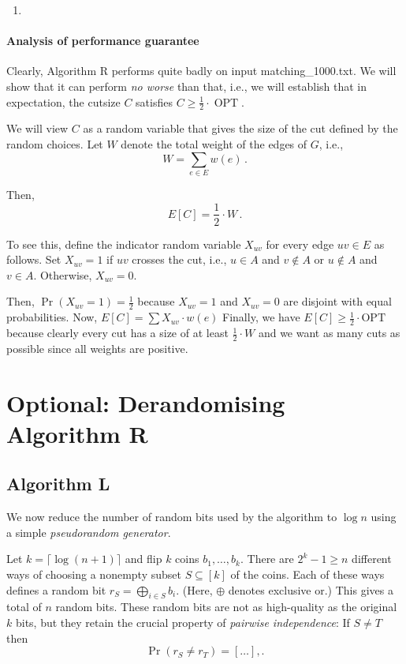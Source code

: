 \documentclass{tufte-handout}
\begin{document}
\begin{enumerate}
\item
\end{enumerate}
\paragraph{Analysis of performance guarantee}

Clearly, Algorithm R performs quite badly on input
  matching\_1000.txt.
We will show that it can perform \emph{no worse} than that, i.e., we
will establish that in expectation, the cutsize $C$ satisfies $C \geq
\frac{1}{2}\cdot \operatorname{OPT}$.


We will view $C$ as a random variable that gives the size of the cut
defined by the random choices.
Let $W$ denote the total weight of the edges of $G$, i.e.,
\[ W= \sum_{e\in E} w(e)\,.\]

Then,
\begin{equation}\label{eq: E[C]}
E[C] = \textstyle\frac{1}{2}\cdot W\,.
\end{equation}

To see this, define the indicator random variable $X_{uv}$ for every
edge $uv\in E$ as follows.
Set $X_{uv}=1$ if $uv$ crosses the cut, i.e., $u\in A$ and $v\notin A$
or $u\notin A$ and $v\in A$.
Otherwise, $X_{uv} = 0$.

Then, $\Pr(X_{uv} = 1) = \frac{1}{2}$ because $X_{uv}=1$ and $X_{uv}=0$
are disjoint with equal probabilities.
Now, $E[C]= \sum{X_{uv} \cdot w(e)}$ Finally, we have
\(E[C]\geq \frac{1}{2}\cdot \text{OPT}\) because clearly
every cut has a size of at least $\frac{1}{2}\cdot W$ and we want as
many cuts as possible since all weights are positive.


\newpage
\section{Optional: Derandomising Algorithm R}

\subsection{Algorithm L}


We now reduce the number of random bits used by the algorithm to $\log
n$ using a simple \emph{pseudorandom generator}.


Let $k=\lceil\log (n+1)\rceil$ and flip $k$ coins $b_1,\ldots, b_k$.
There are $2^k -1 \geq n$ different ways of choosing a nonempty subset
$S\subseteq [k]$ of the coins.
Each of these ways defines a random bit $r_S =\bigoplus_{i\in S} b_i$.
(Here, $\oplus$ denotes exclusive or.)
This gives a total of $n$ random bits.
These random bits are not as high-quality as the original $k$ bits,
but they retain the crucial property of \emph{pairwise independence}:
If $S\neq T$ then
\[ \Pr(r_S\neq r_T) = [\ldots],.\]
\end{document}

